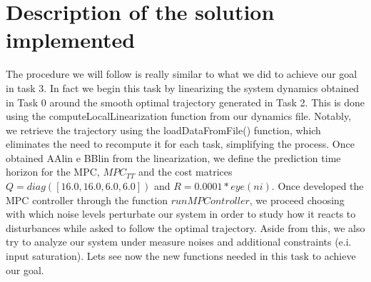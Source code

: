 \documentclass[a4paper,11pt,oneside]{book}
\begin{document}
\section{Description of the solution implemented}
\begin{justify}
    {The procedure we will follow is really similar to what we did to achieve our goal in task 3. In fact we begin this task by linearizing the system dynamics obtained in Task 0 around the smooth optimal trajectory generated in Task 2. This is done using the computeLocalLinearization function from our dynamics file. Notably, we retrieve the trajectory using the loadDataFromFile() function, which eliminates the need to recompute it for each task, simplifying the process. Once obtained AAlin e BBlin from the linearization, we define the prediction time horizon for the MPC, $MPC_{TT}$ and the cost matrices $Q=diag([16.0,16.0,6.0,6.0])$ and $R=0.0001*eye(ni)$. Once developed the MPC controller through the function $runMPController$, we proceed choosing with which noise levels perturbate our system in order to study how it reacts to disturbances while asked to follow the optimal trajectory. Aside from this, we also try to analyze our system under measure noises and additional constraints (e.i. input saturation). Let\textquotesingle s see now the new functions needed in this task to achieve our goal.}
\end{justify}
\end{document}
